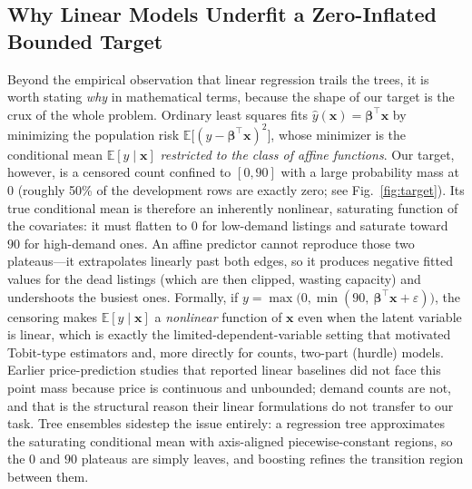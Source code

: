 \documentclass[journal]{IEEEtran}
\begin{document}
\subsection{Why Linear Models Underfit a Zero-Inflated Bounded Target}
\label{sec:linearcritique}
Beyond the empirical observation that linear regression trails the trees, it is
worth stating \emph{why} in mathematical terms, because the shape of our target
is the crux of the whole problem. Ordinary least squares fits
$\hat y(\mathbf{x}) = \boldsymbol{\beta}^{\top}\mathbf{x}$ by minimizing the
population risk $\mathbb{E}\big[(y-\boldsymbol{\beta}^{\top}\mathbf{x})^{2}\big]$,
whose minimizer is the conditional mean $\mathbb{E}[y\mid\mathbf{x}]$
\emph{restricted to the class of affine functions}. Our target, however, is a
censored count confined to $[0,90]$ with a large probability mass at $0$
(roughly 50\% of the development rows are exactly zero; see
Fig.~\ref{fig:target}). Its true conditional mean is therefore an inherently
nonlinear, saturating function of the covariates: it must flatten to $0$ for
low-demand listings and saturate toward $90$ for high-demand ones. An affine
predictor cannot reproduce those two plateaus---it extrapolates linearly past
both edges, so it produces negative fitted values for the dead listings (which
are then clipped, wasting capacity) and undershoots the busiest ones. Formally,
if $y=\max\!\big(0,\min(90,\ \boldsymbol{\beta}^{\top}\mathbf{x}+\varepsilon)\big)$,
the censoring makes $\mathbb{E}[y\mid\mathbf{x}]$ a \emph{nonlinear} function of
$\mathbf{x}$ even when the latent variable is linear, which is exactly the
limited-dependent-variable setting that motivated Tobit-type estimators
\cite{tobin1958} and, more directly for counts, two-part (hurdle) models.
Earlier price-prediction studies that reported linear baselines
\cite{gunter2018,wang2017} did not face this point mass because price is
continuous and unbounded; demand counts are not, and that is the structural
reason their linear formulations do not transfer to our task. Tree ensembles
sidestep the issue entirely: a regression tree approximates the saturating
conditional mean with axis-aligned piecewise-constant regions, so the $0$ and
$90$ plateaus are simply leaves, and boosting refines the transition region
between them.
\end{document}
